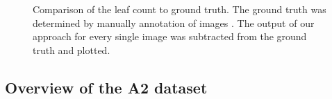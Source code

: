 \documentclass[paper=A4,bibliography=totocnumbered]{scrartcl}
\begin{document}
\begin{figure}
	\qquad
	\caption{Comparison of the leaf count to ground truth. The ground truth was determined by manually annotation of images \citep{Scharr.2014}. The output of our approach for every single image was subtracted from the ground truth and plotted.}
	\label{fig:truth}
\end{figure}


\subsection{Overview of the A2 dataset}
\end{document}
